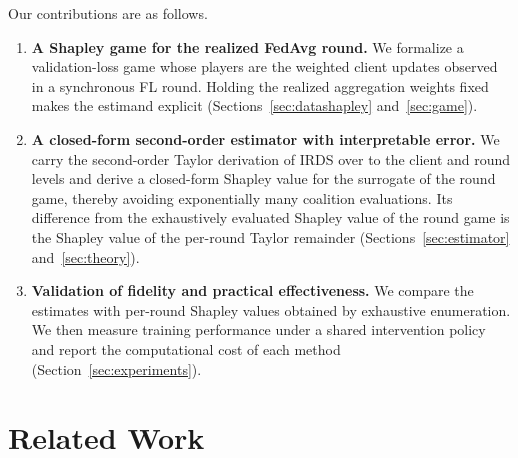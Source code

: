 \documentclass[letterpaper]{article} %
\theoremstyle{definition} %
\newcommand{\djh}[1]{{\leavevmode\color{magenta}[DJ: #1]}}
\begin{document}
Our contributions are as follows.
\begin{enumerate}
    \item \textbf{A Shapley game for the realized FedAvg round.} We
    formalize a validation-loss game whose players are the weighted client updates
    observed in a synchronous FL round. Holding the realized aggregation
    weights fixed makes the estimand explicit
    (Sections~\ref{sec:datashapley} and~\ref{sec:game}).
    \item \textbf{A closed-form second-order estimator with interpretable
    error.} We carry the second-order Taylor derivation of IRDS over to the
    client and round levels and derive a closed-form Shapley value for the
    surrogate of the round game, thereby avoiding exponentially many
    coalition evaluations. Its difference from the exhaustively evaluated
    Shapley value of the round game is the Shapley value of the per-round Taylor remainder
    (Sections~\ref{sec:estimator} and~\ref{sec:theory}).
    \item \textbf{Validation of fidelity and practical effectiveness.} We
    compare the estimates with per-round Shapley values obtained by exhaustive
    enumeration. We then measure training performance under a shared
    intervention policy and report the computational cost of each method
    (Section~\ref{sec:experiments}).
\end{enumerate}



\section{Related Work}
\label{sec:related}
\end{document}
